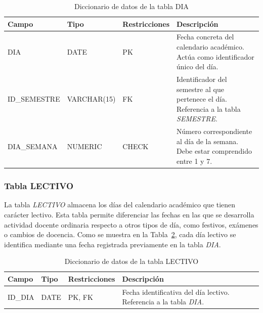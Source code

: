 \begin{table}[H]
	\centering
	\scriptsize
	\setlength{\tabcolsep}{3pt}
	\renewcommand{\arraystretch}{1.15}
	\begin{tabularx}{\textwidth}{@{}
			>{\raggedright\arraybackslash}p{2.6cm}
			>{\raggedright\arraybackslash}p{2.2cm}
			>{\raggedright\arraybackslash}p{2.2cm}
			X@{}}
		\toprule
		\textbf{Campo} & \textbf{Tipo} & \textbf{Restricciones} & \textbf{Descripción} \\
		\midrule
		DIA & DATE & PK & Fecha concreta del calendario académico. Actúa como identificador único del día. \\
		ID\_\newline SEMESTRE & VARCHAR(15) & FK & Identificador del semestre al que pertenece el día. Referencia a la tabla \textit{SEMESTRE}. \\
		DIA\_\newline SEMANA & NUMERIC & CHECK & Número correspondiente al día de la semana. Debe estar comprendido entre 1 y 7. \\
		\bottomrule
	\end{tabularx}
	\caption{Diccionario de datos de la tabla DIA}
	\label{tab:diccionario-dia}
\end{table}

\subsubsection{Tabla LECTIVO}

La tabla \textit{LECTIVO} almacena los días del calendario académico que tienen carácter lectivo. Esta tabla permite diferenciar las fechas en las que se desarrolla actividad docente ordinaria respecto a otros tipos de día, como festivos, exámenes o cambios de docencia. Como se muestra en la Tabla~\ref{tab:diccionario-lectivo}, cada día lectivo se identifica mediante una fecha registrada previamente en la tabla \textit{DIA}.\\

\begin{table}[H]
	\centering
	\scriptsize
	\setlength{\tabcolsep}{3pt}
	\renewcommand{\arraystretch}{1.15}
	\begin{tabularx}{\textwidth}{@{}
			>{\raggedright\arraybackslash}p{2.6cm}
			>{\raggedright\arraybackslash}p{2.2cm}
			>{\raggedright\arraybackslash}p{2.2cm}
			X@{}}
		\toprule
		\textbf{Campo} & \textbf{Tipo} & \textbf{Restricciones} & \textbf{Descripción} \\
		\midrule
		ID\_DIA & DATE & PK, FK & Fecha identificativa del día lectivo. Referencia a la tabla \textit{DIA}. \\
		\bottomrule
	\end{tabularx}
	\caption{Diccionario de datos de la tabla LECTIVO}
	\label{tab:diccionario-lectivo}
\end{table}

